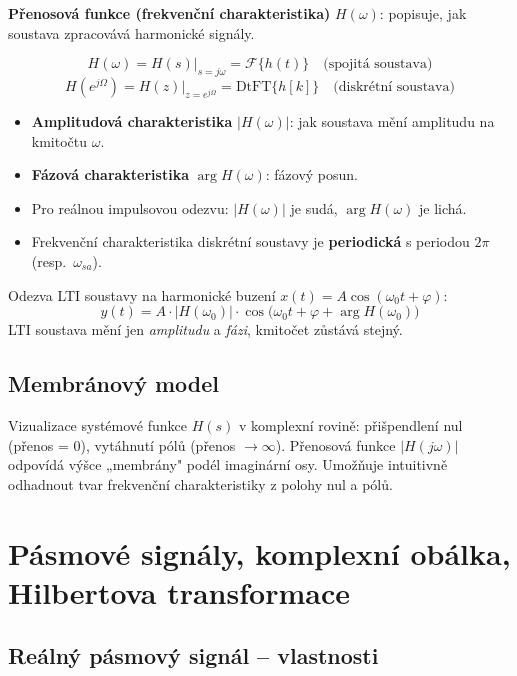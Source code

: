 \documentclass[12pt,a4paper]{article}
\newcommand{\FT}{\mathcal{F}}
\begin{document}
\textbf{Přenosová funkce (frekvenční charakteristika)} $H(\omega)$: popisuje, jak soustava zpracovává harmonické signály.

\begin{matBox}[Vztah]
\[
  H(\omega) = H(s)\big|_{s=j\omega} = \FT\{h(t)\}
  \quad \text{(spojitá soustava)}
\]
\[
  H(e^{j\Omega}) = H(z)\big|_{z=e^{j\Omega}} = \text{DtFT}\{h[k]\}
  \quad \text{(diskrétní soustava)}
\]
\end{matBox}

\begin{itemize}
  \item \textbf{Amplitudová charakteristika} $|H(\omega)|$: jak soustava mění amplitudu na kmitočtu $\omega$.
  \item \textbf{Fázová charakteristika} $\arg H(\omega)$: fázový posun.
  \item Pro reálnou impulsovou odezvu: $|H(\omega)|$ je sudá, $\arg H(\omega)$ je lichá.
  \item Frekvenční charakteristika diskrétní soustavy je \textbf{periodická} s periodou $2\pi$ (resp.\ $\omega_{sa}$).
\end{itemize}

Odezva LTI soustavy na harmonické buzení $x(t) = A\cos(\omega_0 t + \varphi)$:
\[
  y(t) = A\cdot|H(\omega_0)|\cdot\cos\!\bigl(\omega_0 t + \varphi + \arg H(\omega_0)\bigr)
\]
LTI soustava mění jen \emph{amplitudu} a \emph{fázi}, kmitočet zůstává stejný.

\subsection*{Membránový model}

Vizualizace systémové funkce $H(s)$ v komplexní rovině: přišpendlení nul (přenos = 0), vytáhnutí pólů (přenos $\to \infty$). Přenosová funkce $|H(j\omega)|$ odpovídá výšce „membrány" podél imaginární osy. Umožňuje intuitivně odhadnout tvar frekvenční charakteristiky z polohy nul a pólů.

\newpage
\section{Pásmové signály, komplexní obálka, Hilbertova transformace}

\begin{hvezdBox}
\subsection*{Reálný pásmový signál – vlastnosti}
\end{hvezdBox}
\end{document}
